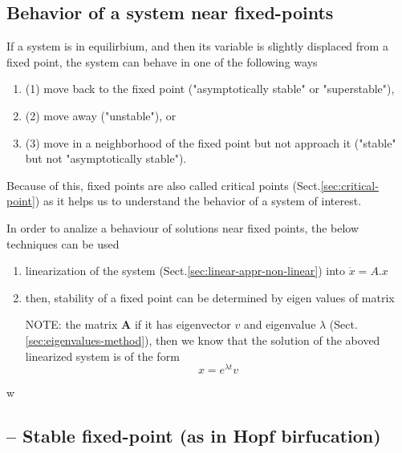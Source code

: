 \subsection{Behavior of a system near fixed-points}
\label{sec:stability-near-fixed-points}

If a system is in equilirbium, and then its variable is slightly
displaced from a fixed point, the system can behave in one of the following ways

\begin{enumerate}
  \item  (1) move back to the fixed point ("asymptotically stable" or "superstable"), 
  
  
  \item (2) move away ("unstable"), or 
  
  \item (3) move in a neighborhood of the fixed point but not approach it
  ("stable" but not "asymptotically stable").
  
\end{enumerate}

Because of this, fixed points are also called critical points
(Sect.\ref{sec:critical-point}) as it helps us to understand the behavior of a
system of interest.

In order to analize a behaviour of solutions near fixed points, the below techniques can be used
\begin{enumerate}	
  
  \item linearization of the system (Sect.\ref{sec:linear-appr-non-linear}) into
  $\dot{x} = A.x$
  
  \item then, stability of a fixed point can be determined by eigen values of matrix 
  
NOTE: the matrix $\mathbf{A}$ if it has eigenvector $v$ and eigenvalue $\lambda$
(Sect.\ref{sec:eigenvalues-method}), then we know that the solution of the
aboved linearized system is of the form
\begin{equation}
x = e^{\lambda t} v
\end{equation}
\end{enumerate}w


\subsection{-- Stable fixed-point (as in Hopf birfucation)}
\label{sec:stable-equilibria}


